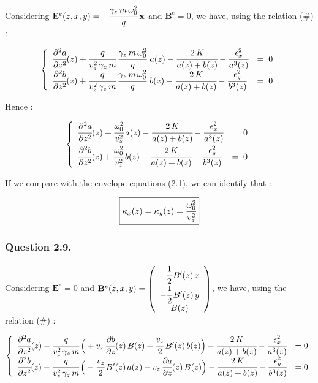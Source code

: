 \documentclass[10pt]{article}
\newcommand{\D}{{\partial}}
\begin{document}
Considering 
$\mathbf{E}^{e}(z,x,y) = -\cfrac{\gamma_{z}\,m\,\omega_{0}^{2}}{q}\,\mathbf{x}$ and $\mathbf{B}^{e} = 0$, we have, using the relation (\#) :


$$
\left\lbrace
    \begin{array}{ll}
\cfrac{\D^2 a}{\D z^2}(z) +\cfrac{q}{v_{z}^2\,\gamma_{z}\,m}\, \cfrac{\gamma_{z}\,m\,\omega_{0}^{2}}{q}\,\,a(z) - \cfrac{2\,K}{a(z)+b(z)} - \cfrac{\epsilon_{x}^2}{a^3(z)} &= \; 0 \\
\cfrac{\D^2 b}{\D z^2}(z) + \cfrac{q}{v_{z}^2\,\gamma_{z}\,m}\, \cfrac{\gamma_{z}\,m\,\omega_{0}^{2}}{q}\,\,b(z) - \cfrac{2\,K}{a(z)+b(z)} - \cfrac{\epsilon_{y}^2}{b^3(z)} &= \; 0
    \end{array}
\right.
$$

Hence :

$$
\left\lbrace
    \begin{array}{ll}
\cfrac{\D^2 a}{\D z^2}(z) + \cfrac{\omega_{0}^{2}}{v_z^2}\,a(z) - \cfrac{2\,K}{a(z)+b(z)} - \cfrac{\epsilon_{x}^2}{a^3(z)} &= \; 0 \vspace{1mm}\\
\cfrac{\D^2 b}{\D z^2}(z) + \cfrac{\omega_{0}^{2}}{v_z^2}\,b(z) - \cfrac{2\,K}{a(z)+b(z)} - \cfrac{\epsilon_{y}^2}{b^3(z)} &= \; 0
    \end{array}
\right.
$$

If we compare with the envelope equations (2.1), we can identify that :

$$\boxed{\kappa_{x}(z) = \kappa_{y}(z) = \cfrac{\omega_{0}^{2}}{v_z^2}}$$


\subsubsection{Question 2.9.}


Considering $\mathbf{E}^{e} = 0$ and 
$\mathbf{B}^{e}(z,x,y) = \left(
\begin{array}{c}
-\cfrac{1}{2}\,B'(z)\,x \\ -\cfrac{1}{2}\,B'(z)\,y \\ B(z)
\end{array}
\right)$, we have, using the relation (\#) :

$$
\left\lbrace
    \begin{array}{ll}
\cfrac{\D^2 a}{\D z^2}(z) - \cfrac{q}{v_{z}^2\,\gamma_{z}\,m}\,\Big( +v_z\,\cfrac{\D b}{\D z}(z)\,B(z) + \cfrac{v_{z}}{2}\,B'(z)\,b(z)\Big) -  \cfrac{2\,K}{a(z)+b(z)} - \cfrac{\epsilon_{x}^2}{a^3(z)} &= 0 \\
\cfrac{\D^2 b}{\D z^2}(z) - \cfrac{q}{v_{z}^2\,\gamma_{z}\,m}\,\Big( -\cfrac{v_{z}}{2}\,B'(z)\,a(z) - v_z\,\cfrac{\D a}{\D z}(z)\,B(z)\Big) - \cfrac{2\,K}{a(z)+b(z)} - \cfrac{\epsilon_{y}^2}{b^3(z)} &= 0 
    \end{array}
\right.
$$
\end{document}
